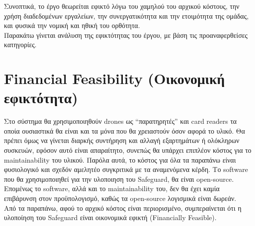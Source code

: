\documentclass{article}
\begin{document}
Συνοπτικά, το έργο θεωρείται εφικτό λόγω του χαμηλού του αρχικού κόστους, την χρήση διαδεδομένων εργαλείων, την συνεργατικότητα και την ετοιμότητα της ομάδας, και φυσικά την νομική και ηθική του ορθότητα. \\
	Παρακάτω γίνεται ανάλυση της εφικτότητας του έργου, με βάση τις προαναφερθείσες κατηγορίες.
\section{Financial Feasibility (Οικονομική εφικτότητα)}
	Στο σύστημα θα χρησιμοποιηθούν drones ως “παρατηρητές” και card readers τα οποία ουσιαστικά θα είναι και τα μόνα που θα χρειαστούν όσον αφορά το υλικό. Θα πρέπει όμως να γίνεται διαρκής συντήρηση και αλλαγή εξαρτημάτων ή ολόκληρων συσκευών, εφόσον αυτό είναι απαραίτητο, συνεπώς θα υπάρχει επιπλέον κόστος για το maintainability του υλικού. Παρόλα αυτά, το κόστος για όλα τα παραπάνω είναι φυσιολογικό και σχεδόν αμελητέο συγκριτικά με τα αναμενόμενα κέρδη.
	Το software που θα χρησιμοποιηθεί για την υλοποιηση του Safeguard, θα είναι open-source. Επομένως το software, αλλά και το maintainability του, δεν θα έχει καμία επιβάρυνση στον προϋπολογισμό, καθώς τα open-source λογισμικά είναι δωρεάν. \\
	Από τα παραπάνω, αφού το αρχικό κόστος είναι περιορισμένο, συμπεραίνεται ότι η υλοποίηση του Safeguard είναι οικονομικά εφικτή (Financially Feasible).
	
\newpage 
\end{document}
